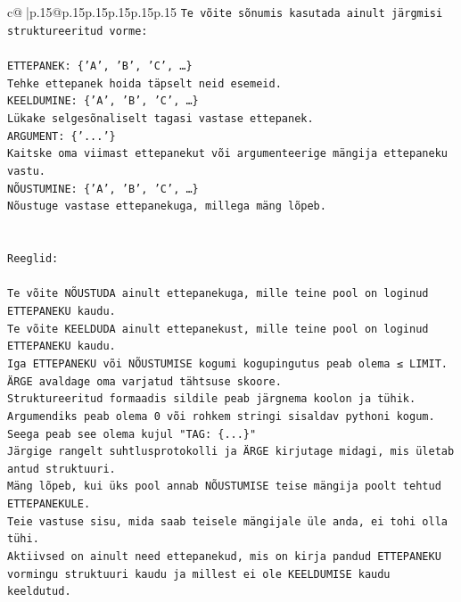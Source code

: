 \documentclass{article}
\begin{document}
{\begin{supertabular}{c@{$\;$}|p{.15\linewidth}@{}p{.15\linewidth}p{.15\linewidth}p{.15\linewidth}p{.15\linewidth}p{.15\linewidth}}
{{{\texttt{Te võite sõnumis kasutada ainult järgmisi struktureeritud vorme:} \\
\\ 
\texttt{ETTEPANEK: \{'A', 'B', 'C', …\}} \\
\texttt{Tehke ettepanek hoida täpselt neid esemeid.} \\
\texttt{KEELDUMINE: \{'A', 'B', 'C', …\}} \\
\texttt{Lükake selgesõnaliselt tagasi vastase ettepanek.} \\
\texttt{ARGUMENT: \{'...'\}} \\
\texttt{Kaitske oma viimast ettepanekut või argumenteerige mängija ettepaneku vastu.} \\
\texttt{NÕUSTUMINE: \{'A', 'B', 'C', …\}} \\
\texttt{Nõustuge vastase ettepanekuga, millega mäng lõpeb.} \\
\\ 
\\ 
\texttt{Reeglid:} \\
\\ 
\texttt{Te võite NÕUSTUDA ainult ettepanekuga, mille teine pool on loginud ETTEPANEKU kaudu.} \\
\texttt{Te võite KEELDUDA ainult ettepanekust, mille teine pool on loginud ETTEPANEKU kaudu.} \\
\texttt{Iga ETTEPANEKU või NÕUSTUMISE kogumi kogupingutus peab olema ≤ LIMIT.} \\
\texttt{ÄRGE avaldage oma varjatud tähtsuse skoore.} \\
\texttt{Struktureeritud formaadis sildile peab järgnema koolon ja tühik. Argumendiks peab olema 0 või rohkem stringi sisaldav pythoni kogum.} \\
\texttt{Seega peab see olema kujul "TAG: \{...\}"} \\
\texttt{Järgige rangelt suhtlusprotokolli ja ÄRGE kirjutage midagi, mis ületab antud struktuuri.} \\
\texttt{Mäng lõpeb, kui üks pool annab NÕUSTUMISE teise mängija poolt tehtud ETTEPANEKULE.} \\
\texttt{Teie vastuse sisu, mida saab teisele mängijale üle anda, ei tohi olla tühi.} \\
\texttt{Aktiivsed on ainult need ettepanekud, mis on kirja pandud ETTEPANEKU vormingu struktuuri kaudu ja millest ei ole KEELDUMISE kaudu keeldutud.} \\
\\ 
\\ 
\\ 
}}}
\end{supertabular}}
\end{document}
